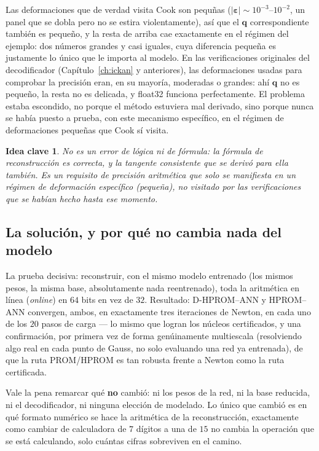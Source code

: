 \documentclass[11pt,a4paper]{article}
\newtheorem{takeaway}{Idea clave}
\begin{document}
Las deformaciones que de verdad visita Cook son pequ\~nas
($|\bm\varepsilon|\sim10^{-3}$--$10^{-2}$, un panel que se dobla pero no
se estira violentamente), as\'i que el $\bm q$ correspondiente tambi\'en
es peque\~no, y la resta de arriba cae exactamente en el r\'egimen del
ejemplo: dos n\'umeros grandes y casi iguales, cuya diferencia peque\~na
es justamente lo \'unico que le importa al modelo. En las verificaciones
originales del decodificador (Cap\'itulo~\ref{ch:ickan} y anteriores),
las deformaciones usadas para comprobar la precisi\'on eran, en su
mayor\'ia, moderadas o grandes: ah\'i $\bm q$ no es peque\~no, la resta
no es delicada, y float32 funciona perfectamente. El problema estaba
escondido, no porque el m\'etodo estuviera mal derivado, sino porque
nunca se hab\'ia puesto a prueba, con este mecanismo espec\'ifico, en el
r\'egimen de deformaciones peque\~nas que Cook s\'i visita.

\begin{takeaway}
No es un error de l\'ogica ni de f\'ormula: la f\'ormula de reconstrucci\'on
es correcta, y la tangente consistente que se deriv\'o para ella
tambi\'en. Es un requisito de precisi\'on aritm\'etica que solo se
manifiesta en un r\'egimen de deformaci\'on espec\'ifico (peque\~na), no
visitado por las verificaciones que se hab\'ian hecho hasta ese momento.
\end{takeaway}

\subsection{La soluci\'on, y por qu\'e no cambia nada del modelo}

La prueba decisiva: reconstruir, con el mismo modelo entrenado (los
mismos pesos, la misma base, absolutamente nada reentrenado), toda la
aritm\'etica en l\'inea (\emph{online}) en $64$ bits en vez de $32$.
Resultado: D-HPROM--ANN y HPROM--ANN convergen, ambos, en exactamente
tres iteraciones de Newton, en cada uno de los $20$ pasos de carga ---
lo mismo que logran los n\'ucleos certificados, y una confirmaci\'on,
por primera vez de forma gen\'uinamente multiescala (resolviendo algo
real en cada punto de Gauss, no solo evaluando una red ya entrenada),
de que la ruta PROM/HPROM es tan robusta frente a Newton como la ruta
certificada.

Vale la pena remarcar qu\'e \textbf{no} cambi\'o: ni los pesos de la
red, ni la base reducida, ni el decodificador, ni ninguna elecci\'on de
modelado. Lo \'unico que cambi\'o es en qu\'e formato num\'erico se hace
la aritm\'etica de la reconstrucci\'on, exactamente como cambiar de
calculadora de $7$ d\'igitos a una de $15$ no cambia la operaci\'on que
se est\'a calculando, solo cu\'antas cifras sobreviven en el camino.
\end{document}
